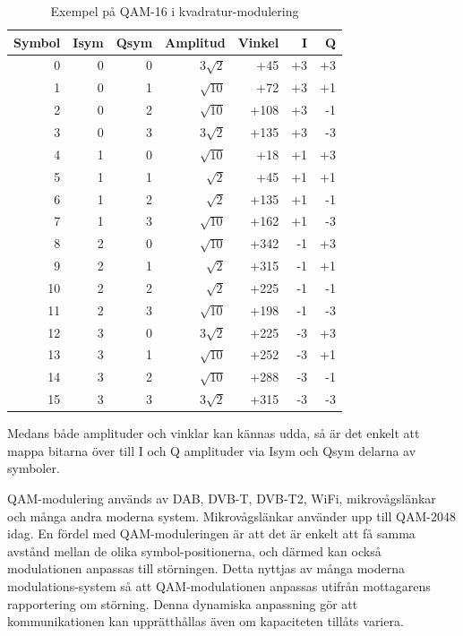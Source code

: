 \begin{rev-nytt}[MAD]
\begin{table}[h]
\begin{center}
\begin{tabular}{|r|r|r|r|r|r|r|}
\hline
Symbol & Isym & Qsym & Amplitud      & Vinkel &  I &   Q \\ \hline
     0 &    0 &    0 & \(3\sqrt{2}\) &    +45 & +3 &  +3 \\
     1 &    0 &    1 & \(\sqrt{10}\) &    +72 & +3 &  +1 \\
     2 &    0 &    2 & \(\sqrt{10}\) &   +108 & +3 &  -1 \\
     3 &    0 &    3 & \(3\sqrt{2}\) &   +135 & +3 &  -3 \\
     4 &    1 &    0 & \(\sqrt{10}\) &    +18 & +1 &  +3 \\
     5 &    1 &    1 &  \(\sqrt{2}\) &    +45 & +1 &  +1 \\
     6 &    1 &    2 &  \(\sqrt{2}\) &   +135 & +1 &  -1 \\
     7 &    1 &    3 & \(\sqrt{10}\) &   +162 & +1 &  -3 \\
     8 &    2 &    0 & \(\sqrt{10}\) &   +342 & -1 &  +3 \\
     9 &    2 &    1 &  \(\sqrt{2}\) &   +315 & -1 &  +1 \\
    10 &    2 &    2 &  \(\sqrt{2}\) &   +225 & -1 &  -1 \\
    11 &    2 &    3 & \(\sqrt{10}\) &   +198 & -1 &  -3 \\
    12 &    3 &    0 & \(3\sqrt{2}\) &   +225 & -3 &  +3 \\
    13 &    3 &    1 & \(\sqrt{10}\) &   +252 & -3 &  +1 \\
    14 &    3 &    2 & \(\sqrt{10}\) &   +288 & -3 &  -1 \\
    15 &    3 &    3 & \(3\sqrt{2}\) &   +315 & -3 &  -3 \\ \hline
\end{tabular}
\end{center}
\caption{Exempel på QAM-16 i kvadratur-modulering}
\label{tab:QAM-16}
\end{table}

Medans både amplituder och vinklar kan kännas udda, så är det enkelt att
mappa bitarna över till I och Q amplituder via Isym och Qsym delarna av
symboler.

QAM-modulering används av DAB, DVB-T, DVB-T2, WiFi, mikrovågslänkar och många
andra moderna system. Mikrovågslänkar använder upp till QAM-2048 idag.
En fördel med QAM-moduleringen är att det är enkelt att få samma avstånd
mellan de olika symbol-positionerna, och därmed kan också modulationen anpassas
till störningen. Detta nyttjas av många moderna modulations-system så att
QAM-modulationen anpassas utifrån mottagarens rapportering om störning.
Denna dynamiska anpassning gör att kommunikationen kan upprätthållas även om
kapaciteten tillåts variera.

\end{rev-nytt}

